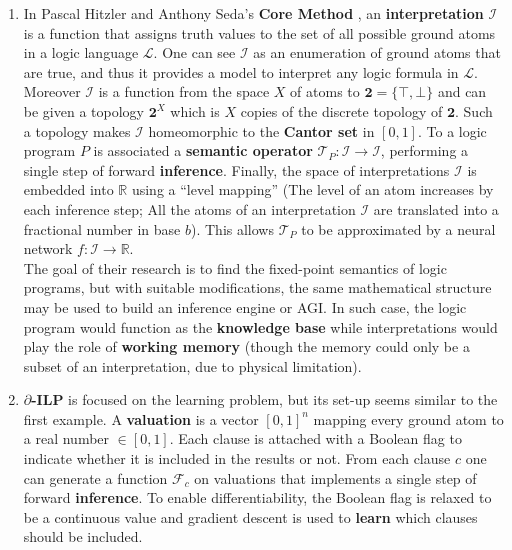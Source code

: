 \documentclass[orivec]{llncs}
\begin{document}
\begin{enumerate}
	\item In Pascal Hitzler and Anthony Seda's \textbf{Core Method} \cite{Hitzler2011}, an \textbf{interpretation} $\mathcal{I}$ is a function that assigns truth values to the set of all possible ground atoms in a logic language $\mathcal{L}$.  One can see $\mathcal{I}$ as an enumeration of ground atoms that are true, and thus it provides a model to interpret any logic formula in $\mathcal{L}$.  Moreover $\mathcal{I}$ is a function from the space $X$ of atoms to $\mathbf{2} = \{ \top, \bot \}$ and can be given a topology $\mathbf{2}^X$ which is $X$ copies of the discrete topology of $\mathbf{2}$.  Such a topology makes $\mathcal{I}$ homeomorphic to the \textbf{Cantor set} in $[0,1]$. To a logic program $P$ is associated a \textbf{semantic operator} $\mathcal{T}_P : \mathcal{I} \rightarrow \mathcal{I}$, performing a single step of forward \textbf{inference}.  Finally, the space of interpretations $\mathcal{I}$ is embedded into $\mathbb{R}$ using a ``level mapping'' (The level of an atom increases by each inference step;  All the atoms of an interpretation $\mathcal{I}$ are translated into a fractional number in base $b$).  This allows $\mathcal{T}_P$ to be approximated by a neural network $f: \mathcal{I} \rightarrow \mathbb{R}$.  \\
	The goal of their research is to find the fixed-point semantics of logic programs, but with suitable modifications, the same mathematical structure may be used to build an inference engine or AGI.  In such case, the logic program would function as the \textbf{knowledge base} while interpretations would play the role of \textbf{working memory} (though the memory could only be a subset of an interpretation, due to physical limitation).

	\item \textbf{$\partial$-ILP} \cite{Evans2017} is focused on the learning problem, but its set-up seems similar to the first example.  A \textbf{valuation} is a vector $[0,1]^n$ mapping every ground atom to a real number $\in [0,1]$.  Each clause is attached with a Boolean flag to indicate whether it is included in the results or not.  From each clause $c$ one can generate a function $\mathcal{F}_c$ on valuations that implements a single step of forward \textbf{inference}.  To enable differentiability, the Boolean flag is relaxed to be a continuous value and gradient descent is used to \textbf{learn} which clauses should be included.
\end{enumerate}
\end{document}
